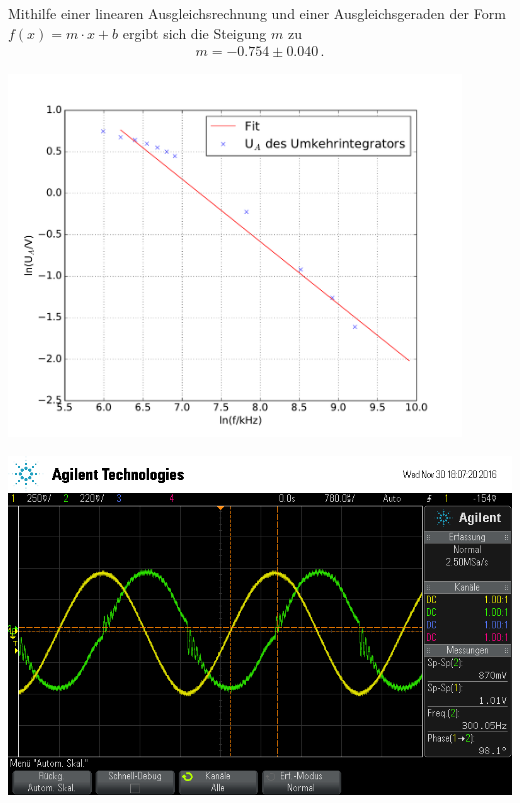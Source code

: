 \documentclass[]{scrartcl}
\begin{document}
Mithilfe einer linearen Ausgleichsrechnung und einer Ausgleichsgeraden der Form $f(x)=m\cdot x +b$ ergibt sich die Steigung $m$ zu
\begin{align*}
m = -0.754\pm 0.040\,.
\end{align*}
\begin{center}
	\includegraphics[width=12cm]{images/integrator.pdf}
	\label{fig:integrator}
\end{center}
\begin{minipage}[t]{0.5\textwidth}
	\includegraphics[width=\textwidth]{images/sinus_int}
	\label{fig:sinusint}
\end{minipage}
\hspace{0.1\textwidth}
\end{document}
